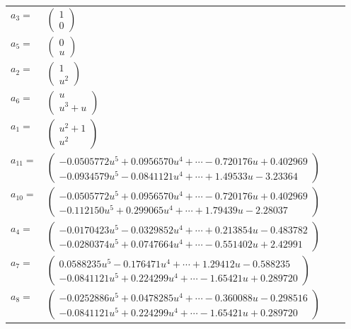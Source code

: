 \documentclass[1p]{elsarticle_modified}
\theoremstyle{definition}
\begin{document}
\begin{tabular}{m{7pt} m{180pt} m{7pt} m{180pt} }
\flushright $a_{3}=$&$\begin{pmatrix}1\\0\end{pmatrix}$ \\
\flushright $a_{5}=$&$\begin{pmatrix}0\\u\end{pmatrix}$ \\
\flushright $a_{2}=$&$\begin{pmatrix}1\\u^2\end{pmatrix}$ \\
\flushright $a_{6}=$&$\begin{pmatrix}u\\u^3+u\end{pmatrix}$ \\
\flushright $a_{1}=$&$\begin{pmatrix}u^2+1\\u^2\end{pmatrix}$ \\
\flushright $a_{11}=$&$\begin{pmatrix}-0.0505772 u^{5}+0.0956570 u^{4}+\cdots-0.720176 u+0.402969\\-0.0934579 u^{5}-0.0841121 u^{4}+\cdots+1.49533 u-3.23364\end{pmatrix}$ \\
\flushright $a_{10}=$&$\begin{pmatrix}-0.0505772 u^{5}+0.0956570 u^{4}+\cdots-0.720176 u+0.402969\\-0.112150 u^{5}+0.299065 u^{4}+\cdots+1.79439 u-2.28037\end{pmatrix}$ \\
\flushright $a_{4}=$&$\begin{pmatrix}-0.0170423 u^{5}-0.0329852 u^{4}+\cdots+0.213854 u-0.483782\\-0.0280374 u^{5}+0.0747664 u^{4}+\cdots-0.551402 u+2.42991\end{pmatrix}$ \\
\flushright $a_{7}=$&$\begin{pmatrix}0.0588235 u^{5}-0.176471 u^{4}+\cdots+1.29412 u-0.588235\\-0.0841121 u^{5}+0.224299 u^{4}+\cdots-1.65421 u+0.289720\end{pmatrix}$ \\
\flushright $a_{8}=$&$\begin{pmatrix}-0.0252886 u^{5}+0.0478285 u^{4}+\cdots-0.360088 u-0.298516\\-0.0841121 u^{5}+0.224299 u^{4}+\cdots-1.65421 u+0.289720\end{pmatrix}$ \\

\end{tabular}
\end{document}
